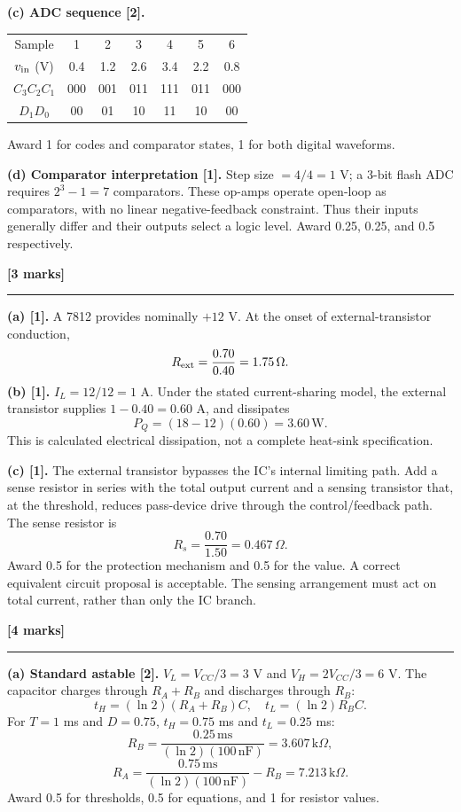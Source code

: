 \documentclass[11pt,a4paper]{article}
\newcommand{\q}[2]{\par\vspace{3pt}{\large\bfseries\color{ink}#1}\hfill\textbf{[#2 marks]}\par\hrule\vspace{7pt}}
\newcommand{\kohm}{\,\mathrm{k}\Omega}
\begin{document}
\textbf{(c) ADC sequence [2].}
\begin{center}\begin{tabular}{c*{6}{c}}\toprule
Sample &1&2&3&4&5&6\\
$v_{\rm in}$ (V)&0.4&1.2&2.6&3.4&2.2&0.8\\
$C_3C_2C_1$&000&001&011&111&011&000\\
$D_1D_0$&00&01&10&11&10&00\\\bottomrule\end{tabular}\end{center}
\begin{center}\end{center}
Award 1 for codes and comparator states, 1 for both digital waveforms.

\textbf{(d) Comparator interpretation [1].} Step size $=4/4=1$ V; a 3-bit flash ADC requires $2^3-1=7$ comparators. These op-amps operate open-loop as comparators, with no linear negative-feedback constraint. Thus their inputs generally differ and their outputs select a logic level. Award 0.25, 0.25, and 0.5 respectively.
\newpage
\q{Question 3}{3}
\textbf{(a) [1].} A 7812 provides nominally $+12$ V. At the onset of external-transistor conduction,
\[
R_{\rm ext}=\frac{0.70}{0.40}=1.75\,\Omega.
\]
\textbf{(b) [1].} $I_L=12/12=1$ A. Under the stated current-sharing model, the external transistor supplies $1-0.40=0.60$ A, and dissipates
\[
P_Q=(18-12)(0.60)=3.60\,\mathrm W.
\]
This is calculated electrical dissipation, not a complete heat-sink specification.

\textbf{(c) [1].} The external transistor bypasses the IC's internal limiting path. Add a sense resistor in series with the total output current and a sensing transistor that, at the threshold, reduces pass-device drive through the control/feedback path. The sense resistor is
\[
R_s=\frac{0.70}{1.50}=0.467\,\Omega.
\]
Award 0.5 for the protection mechanism and 0.5 for the value. A correct equivalent circuit proposal is acceptable. The sensing arrangement must act on total current, rather than only the IC branch.
\q{Question 4}{4}
\textbf{(a) Standard astable [2].} $V_L=V_{CC}/3=3$ V and $V_H=2V_{CC}/3=6$ V. The capacitor charges through $R_A+R_B$ and discharges through $R_B$:
\[
t_H=(\ln2)(R_A+R_B)C,\quad t_L=(\ln2)R_BC.
\]
For $T=1$ ms and $D=0.75$, $t_H=0.75$ ms and $t_L=0.25$ ms:
\[
R_B=\frac{0.25\,\mathrm{ms}}{(\ln2)(100\,\mathrm{nF})}=3.607\kohm,
\]
\[
R_A=\frac{0.75\,\mathrm{ms}}{(\ln2)(100\,\mathrm{nF})}-R_B=7.213\kohm.
\]
Award 0.5 for thresholds, 0.5 for equations, and 1 for resistor values.
\end{document}
